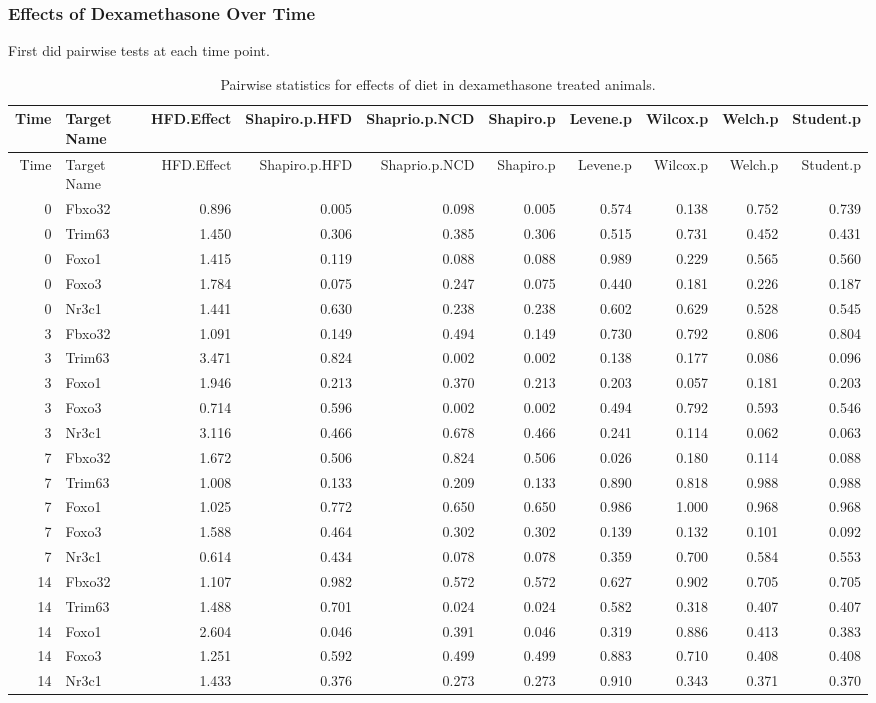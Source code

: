 \documentclass[]{article}
\begin{document}
\subsubsection{Effects of Dexamethasone Over
Time}\label{effects-of-dexamethasone-over-time}

First did pairwise tests at each time point.

\begin{longtable}[]{@{}rlrrrrrrrr@{}}
\caption{Pairwise statistics for effects of diet in dexamethasone
treated animals.}\tabularnewline
\toprule
Time & Target Name & HFD.Effect & Shapiro.p.HFD & Shaprio.p.NCD &
Shapiro.p & Levene.p & Wilcox.p & Welch.p & Student.p\tabularnewline
\midrule
\endfirsthead
\toprule
Time & Target Name & HFD.Effect & Shapiro.p.HFD & Shaprio.p.NCD &
Shapiro.p & Levene.p & Wilcox.p & Welch.p & Student.p\tabularnewline
\midrule
\endhead
0 & Fbxo32 & 0.896 & 0.005 & 0.098 & 0.005 & 0.574 & 0.138 & 0.752 &
0.739\tabularnewline
0 & Trim63 & 1.450 & 0.306 & 0.385 & 0.306 & 0.515 & 0.731 & 0.452 &
0.431\tabularnewline
0 & Foxo1 & 1.415 & 0.119 & 0.088 & 0.088 & 0.989 & 0.229 & 0.565 &
0.560\tabularnewline
0 & Foxo3 & 1.784 & 0.075 & 0.247 & 0.075 & 0.440 & 0.181 & 0.226 &
0.187\tabularnewline
0 & Nr3c1 & 1.441 & 0.630 & 0.238 & 0.238 & 0.602 & 0.629 & 0.528 &
0.545\tabularnewline
3 & Fbxo32 & 1.091 & 0.149 & 0.494 & 0.149 & 0.730 & 0.792 & 0.806 &
0.804\tabularnewline
3 & Trim63 & 3.471 & 0.824 & 0.002 & 0.002 & 0.138 & 0.177 & 0.086 &
0.096\tabularnewline
3 & Foxo1 & 1.946 & 0.213 & 0.370 & 0.213 & 0.203 & 0.057 & 0.181 &
0.203\tabularnewline
3 & Foxo3 & 0.714 & 0.596 & 0.002 & 0.002 & 0.494 & 0.792 & 0.593 &
0.546\tabularnewline
3 & Nr3c1 & 3.116 & 0.466 & 0.678 & 0.466 & 0.241 & 0.114 & 0.062 &
0.063\tabularnewline
7 & Fbxo32 & 1.672 & 0.506 & 0.824 & 0.506 & 0.026 & 0.180 & 0.114 &
0.088\tabularnewline
7 & Trim63 & 1.008 & 0.133 & 0.209 & 0.133 & 0.890 & 0.818 & 0.988 &
0.988\tabularnewline
7 & Foxo1 & 1.025 & 0.772 & 0.650 & 0.650 & 0.986 & 1.000 & 0.968 &
0.968\tabularnewline
7 & Foxo3 & 1.588 & 0.464 & 0.302 & 0.302 & 0.139 & 0.132 & 0.101 &
0.092\tabularnewline
7 & Nr3c1 & 0.614 & 0.434 & 0.078 & 0.078 & 0.359 & 0.700 & 0.584 &
0.553\tabularnewline
14 & Fbxo32 & 1.107 & 0.982 & 0.572 & 0.572 & 0.627 & 0.902 & 0.705 &
0.705\tabularnewline
14 & Trim63 & 1.488 & 0.701 & 0.024 & 0.024 & 0.582 & 0.318 & 0.407 &
0.407\tabularnewline
14 & Foxo1 & 2.604 & 0.046 & 0.391 & 0.046 & 0.319 & 0.886 & 0.413 &
0.383\tabularnewline
14 & Foxo3 & 1.251 & 0.592 & 0.499 & 0.499 & 0.883 & 0.710 & 0.408 &
0.408\tabularnewline
14 & Nr3c1 & 1.433 & 0.376 & 0.273 & 0.273 & 0.910 & 0.343 & 0.371 &
0.370\tabularnewline
\bottomrule
\end{longtable}
\end{document}
